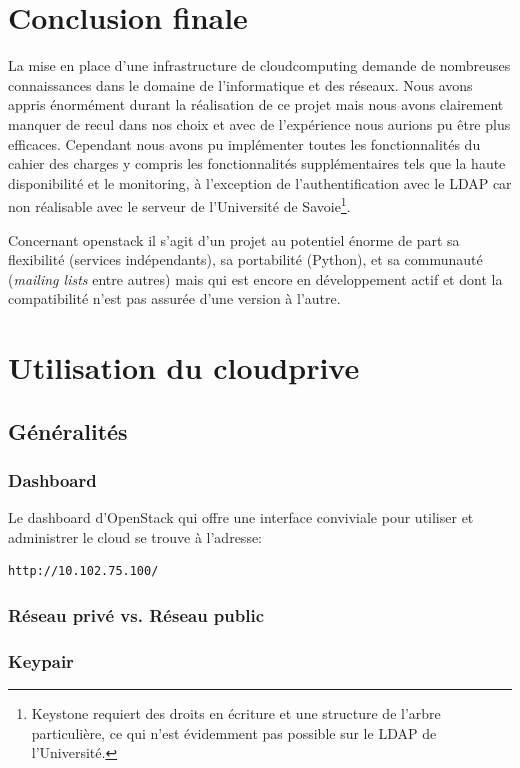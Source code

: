 \documentclass[a4paper,oneside]{report}
\begin{document}
\chapter{Conclusion finale}
La mise en place d'une infrastructure de \gls{cloudcomputing} demande de nombreuses connaissances dans le domaine de l'informatique et des réseaux.
Nous avons appris énormément durant la réalisation de ce projet mais nous avons clairement manquer de recul dans nos choix et avec de l'expérience nous aurions pu être plus efficaces.\newline
Cependant nous avons pu implémenter toutes les fonctionnalités du cahier des charges y compris les fonctionnalités supplémentaires tels que la haute disponibilité et le monitoring, à l'exception de l'authentification avec le LDAP car non réalisable avec le serveur de l'Université de Savoie\footnote{Keystone requiert des droits en écriture et une structure de l'arbre particulière, ce qui n'est évidemment pas possible sur le LDAP de l'Université.}.

Concernant \gls{openstack} il s'agit d'un projet au potentiel énorme de part sa flexibilité (services indépendants), sa portabilité (Python), et sa communauté (\emph{mailing lists} entre autres) mais qui est encore en développement actif et dont la compatibilité n'est pas assurée d'une version à l'autre.




\appendix
\chapter{Utilisation du \gls{cloudprive}}
\section{Généralités}
\subsection{Dashboard}
Le dashboard d'OpenStack qui offre une interface conviviale pour utiliser et administrer le cloud se trouve à l'adresse:
\begin{verbatim}
http://10.102.75.100/
\end{verbatim}

\subsection{Réseau privé vs. Réseau public}

\subsection{Keypair}
\end{document}
